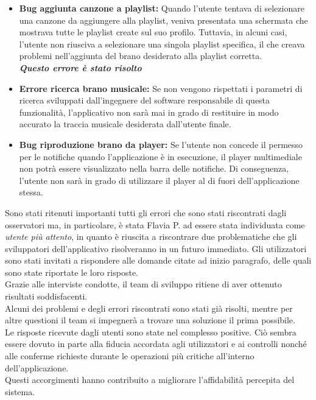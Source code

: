 \documentclass{article}
\begin{document}
		\begin{itemize}
			\item \textbf{Bug aggiunta canzone a playlist:} 
			Quando l'utente tentava di selezionare una canzone da aggiungere alla playlist, veniva presentata una schermata che mostrava tutte le playlist create sul suo profilo. Tuttavia, in alcuni casi, l'utente non riusciva a selezionare una singola playlist specifica, il che creava problemi nell'aggiunta del brano desiderato alla playlist corretta.\\
			\textit{\textbf{Questo errore è stato risolto}}
			
			\item \textbf{Errore ricerca brano musicale:}
			Se non vengono rispettati i parametri di ricerca sviluppati dall'ingegnere del software responsabile di questa funzionalità, l'applicativo non sarà mai in grado di restituire in modo accurato la traccia musicale desiderata dall'utente finale.
			\item \textbf{Bug riproduzione brano da player:}
			Se l'utente non concede il permesso per le notifiche quando l'applicazione è in esecuzione, il player multimediale non potrà essere visualizzato nella barra delle notifiche. Di conseguenza, l'utente non sarà in grado di utilizzare il player al di fuori dell'applicazione stessa.
		\end{itemize}
		Sono stati ritenuti importanti tutti gli errori che sono stati riscontrati dagli osservatori ma, in particolare, è stata Flavia P. ad essere stata individuata come \textit{utente più attento}, in quanto è riuscita a riscontrare due problematiche che gli sviluppatori dell'applicativo risolveranno in un futuro immediato.
		Gli utilizzatori sono stati invitati a rispondere alle domande citate ad inizio paragrafo, delle quali sono state riportate le loro risposte.\\
		
		Grazie alle interviste condotte, il team di sviluppo ritiene di aver ottenuto risultati soddisfacenti. 
		\\Alcuni dei problemi e degli errori riscontrati sono stati già risolti, mentre per altre questioni il team si impegnerà a trovare una soluzione il prima possibile.\\
		
		Le risposte ricevute dagli utenti sono state nel complesso positive. Ciò sembra essere dovuto in parte alla fiducia accordata agli utilizzatori e ai controlli nonché alle conferme richieste durante le operazioni più critiche all'interno dell'applicazione. 
		\\Questi accorgimenti hanno contribuito a migliorare l'affidabilità percepita del sistema.
\end{document}
